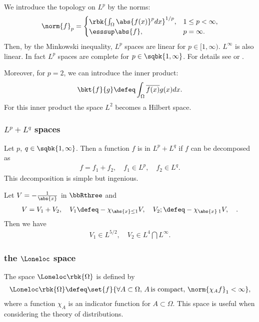 \documentclass[openany, a4paper, oneside]{jsbook}
\begin{document}
We introduce the topology on $L^p$ by the norms:
\begin{align}
 \norm{f}_p
 =
 \begin{cases}
  \rbk{\int_{\Omega} \abs{f (x)}^p dx}^{1/p}, & 1 \leq p < \infty, \\
  \esssup \abs{f}, & p = \infty.
 \end{cases}
\end{align}
Then, by the Minkowski inequality, $L^p$ spaces are linear for $p \in [1, \infty)$.
$L^{\infty}$ is also linear.
In fact $L^p$ spaces are complete for $p \in \sqbk{1, \infty}$.
For details see \cite{SeizoIto1} or \cite{LiebLoss1}.

Moreover, for $p=2$, we can introduce the inner product:
\begin{align}
 \bkt{f}{g}
 \defeq
 \int_{\Omega} \overline{f (x)} g (x) dx.
\end{align}
For this inner product the space $L^2$ becomes a Hilbert space.
\subsubsection{$L^p+L^q$ spaces}

Let $p$, $q \in \sqbk{1, \infty}$.
Then a function $f$ is in $L^p + L^q$ if $f$ can be decomposed as
\begin{align}
 f = f_1 + f_2, \quad
 f_1 \in L^p, \quad f_2 \in L^q.
\end{align}
This decomposition is simple but ingenious.

\begin{ex}
 Let $V = - \frac{1}{\abs{x}}$ in $\bbRthree$ and
 \begin{align}
  V = V_1 + V_2, \quad
  V_1
  \defeq
  -\chi_{\abs{x} \leq 1} V, \quad
  V_2;
  \defeq
  -\chi_{\abs{x} \> 1} V, \quad.
 \end{align}
 Then we have
 \begin{align}
  V_1 \in L^{5/2}, \quad
  V_2 \in L^{4} \bigcap L^{\infty}.
 \end{align}
\end{ex}
\subsubsection{the $\Loneloc$ space}

The space $\Loneloc \rbk{\Omega}$ is defined by
\begin{align}
 \Loneloc \rbk{\Omega}
 \defeq
 \set{f}{\forall A \subset \Omega, \, A \, \text{is compact}, \, \norm{\chi_A f}_1 < \infty},
\end{align}
where a function $\chi_A$ is an indicator function for $A \subset \Omega$.
This space is useful when considering the theory of distributions.
\end{document}
